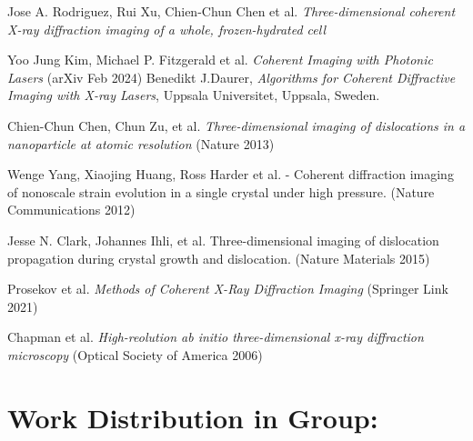\documentclass[12pt, a4paper, twocolumn]{article}
\begin{document}
\begin{thebibliography}{9}

	Jose A. Rodriguez, Rui Xu, Chien-Chun Chen et al. \emph{Three-dimensional coherent X-ray diffraction imaging of a whole, frozen-hydrated cell} 
	
	Yoo Jung Kim, Michael P. Fitzgerald et al. \emph{Coherent Imaging with Photonic Lasers} (arXiv Feb 2024)
	\bibitem{}
	Benedikt J.Daurer, \emph{Algorithms for Coherent Diffractive Imaging with X-ray Lasers}, Uppsala Universitet, Uppsala, Sweden.
	
	\bibitem{}
	Chien-Chun Chen, Chun Zu, et al. \emph{Three-dimensional imaging of dislocations in a nanoparticle at atomic resolution} (Nature 2013)
	
	\bibitem{}
	Wenge Yang, Xiaojing Huang, Ross Harder et al. - Coherent diffraction imaging of nonoscale strain evolution in a single crystal under high pressure. (Nature Communications 2012)
	
	\bibitem{}
	Jesse N. Clark, Johannes Ihli, et al. Three-dimensional imaging of dislocation propagation during crystal growth and dislocation. (Nature Materials 2015)
	
	\bibitem{}
	Prosekov et al. \emph{Methods of Coherent X-Ray Diffraction Imaging} (Springer Link 2021)
	
	\bibitem{}
	Chapman et al. \emph{High-reolution ab initio three-dimensional x-ray diffraction microscopy} (Optical Society of America 2006)
	
	\end{thebibliography}
\newpage
\section*{Work Distribution in Group:}
\begin{center}
\end{center}
\end{document}
